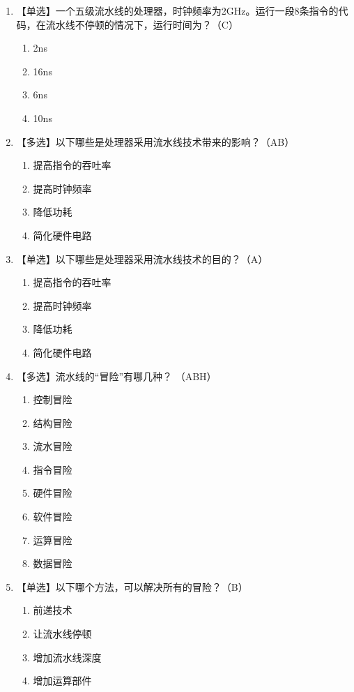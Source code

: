 \documentclass[12pt, a4paper]{article}
\begin{document}
\begin{enumerate}[label=\arabic*.]
    \item 【单选】一个五级流水线的处理器，时钟频率为2GHz。运行一段8条指令的代码，在流水线不停顿的情况下，运行时间为？（C）
    \begin{enumerate}[label=\Alph*.]
        \item 2ns \item 16ns \item 6ns \item 10ns 
    \end{enumerate}

    \item 【多选】以下哪些是处理器采用流水线技术带来的影响？（AB）
    \begin{enumerate}[label=\Alph*.]
        \item 提高指令的吞吐率 \item 提高时钟频率 \item 降低功耗 \item 简化硬件电路
    \end{enumerate}

    \item 【单选】以下哪些是处理器采用流水线技术的目的？（A）
    \begin{enumerate}[label=\Alph*.]
        \item 提高指令的吞吐率 \item 提高时钟频率 \item 降低功耗 \item 简化硬件电路
    \end{enumerate}

    \item 【多选】流水线的“冒险”有哪几种？ （ABH） 
    \begin{enumerate}[label=\Alph*.]
        \item 控制冒险 \item 结构冒险 \item 流水冒险 \item 指令冒险 \item 硬件冒险 \item 软件冒险 \item 运算冒险 \item 数据冒险    
    \end{enumerate}

    \item 【单选】以下哪个方法，可以解决所有的冒险？（B）
    \begin{enumerate}[label=\Alph*.]
        \item 前递技术 \item 让流水线停顿 \item 增加流水线深度 \item 增加运算部件
    \end{enumerate}


\end{enumerate}
\end{document}
